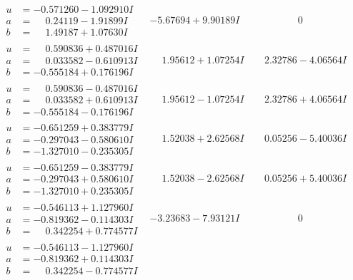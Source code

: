 \documentclass[1p]{elsarticle_modified}
\theoremstyle{definition}
\begin{document}
$$\begin{array}{c|c|c}
\begin{aligned}
u &= -0.571260 - 1.092910 I \\
a &= \phantom{-}0.24119 - 1.91899 I \\
b &= \phantom{-}1.49187 + 1.07630 I\end{aligned}
 & -5.67694 + 9.90189 I & \phantom{-0.000000 } 0 \\ \hline\begin{aligned}
u &= \phantom{-}0.590836 + 0.487016 I \\
a &= \phantom{-}0.033582 - 0.610913 I \\
b &= -0.555184 + 0.176196 I\end{aligned}
 & \phantom{-}1.95612 + 1.07254 I & \phantom{-}2.32786 - 4.06564 I \\ \hline\begin{aligned}
u &= \phantom{-}0.590836 - 0.487016 I \\
a &= \phantom{-}0.033582 + 0.610913 I \\
b &= -0.555184 - 0.176196 I\end{aligned}
 & \phantom{-}1.95612 - 1.07254 I & \phantom{-}2.32786 + 4.06564 I \\ \hline\begin{aligned}
u &= -0.651259 + 0.383779 I \\
a &= -0.297043 - 0.580610 I \\
b &= -1.327010 - 0.235305 I\end{aligned}
 & \phantom{-}1.52038 + 2.62568 I & \phantom{-}0.05256 - 5.40036 I \\ \hline\begin{aligned}
u &= -0.651259 - 0.383779 I \\
a &= -0.297043 + 0.580610 I \\
b &= -1.327010 + 0.235305 I\end{aligned}
 & \phantom{-}1.52038 - 2.62568 I & \phantom{-}0.05256 + 5.40036 I \\ \hline\begin{aligned}
u &= -0.546113 + 1.127960 I \\
a &= -0.819362 - 0.114303 I \\
b &= \phantom{-}0.342254 + 0.774577 I\end{aligned}
 & -3.23683 - 7.93121 I & \phantom{-0.000000 } 0 \\ \hline\begin{aligned}
u &= -0.546113 - 1.127960 I \\
a &= -0.819362 + 0.114303 I \\
b &= \phantom{-}0.342254 - 0.774577 I\end{aligned}

\end{array}$$
\end{document}
